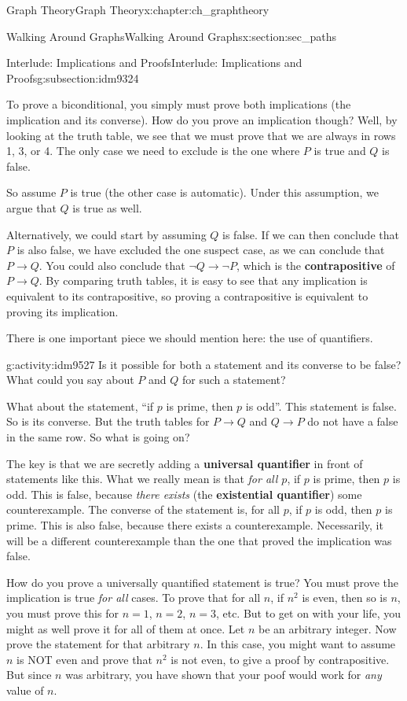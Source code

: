\documentclass[oneside,10pt,]{book}
\newcommand{\terminology}[1]{\textbf{#1}}
\numberwithin{equation}{chapter}
\def\imp{\rightarrow}
\begin{document}
\begin{chapterptx}{Graph Theory}{}{Graph Theory}{}{}{x:chapter:ch_graphtheory}
\begin{sectionptx}{Walking Around Graphs}{}{Walking Around Graphs}{}{}{x:section:sec_paths}
\begin{subsectionptx}{Interlude: Implications and Proofs}{}{Interlude: Implications and Proofs}{}{}{g:subsection:idm9324}
\par
To prove a biconditional, you simply must prove both implications (the implication and its converse).  How do you prove an implication though?  Well, by looking at the truth table, we see that we must prove that we are always in rows 1, 3, or 4.  The only case we need to exclude is the one where \(P\) is true and \(Q\) is false.%
\par
So assume \(P\) is true (the other case is automatic).  Under this assumption, we argue that \(Q\) is true as well.%
\par
Alternatively, we could start by assuming \(Q\) is false.  If we can then conclude that \(P\) is also false, we have excluded the one suspect case, as we can conclude that \(P \imp Q\).  You could also conclude that \(\neg Q \imp \neg P\), which is the \terminology{contrapositive} of \(P \imp Q\).  By comparing truth tables, it is easy to see that any implication is equivalent to its contrapositive, so proving a contrapositive is equivalent to proving its implication.%
\par
There is one important piece we should mention here: the use of quantifiers.%
\begin{activity}{}{g:activity:idm9527}%
Is it possible for both a statement and its converse to be false?  What could you say about \(P\) and \(Q\) for such a statement?%
\end{activity}
What about the statement, ``if \(p\) is prime, then \(p\) is odd''.  This statement is false.  So is its converse.  But the truth tables for \(P \imp Q\) and \(Q \imp P\) do not have a false in the same row.  So what is going on?%
\par
The key is that we are secretly adding a \terminology{universal quantifier} in front of statements like this.  What we really mean is that \emph{for all \(p\)}, if \(p\) is prime, then \(p\) is odd.  This is false, because \emph{there exists} (the \terminology{existential quantifier}) some counterexample.  The converse of the statement is, for all \(p\), if \(p\) is odd, then \(p\) is prime.  This is also false, because there exists a counterexample.  Necessarily, it will be a different counterexample than the one that proved the implication was false.%
\par
How do you prove a universally quantified statement is true?  You must prove the implication is true \emph{for all} cases.  To prove that for all \(n\), if \(n^2\) is even, then so is \(n\), you must prove this for \(n = 1\), \(n = 2\), \(n =3\), etc.  But to get on with your life, you might as well prove it for all of them at once.  Let \(n\) be an arbitrary integer.  Now prove the statement for that arbitrary \(n\).  In this case, you might want to assume \(n\) is NOT even and prove that \(n^2\) is not even, to give a proof by contrapositive.  But since \(n\) was arbitrary, you have shown that your poof would work for \emph{any} value of \(n\).%

\end{subsectionptx}
\end{sectionptx}
\end{chapterptx}
\end{document}

